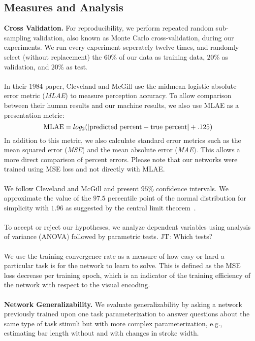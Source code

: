 \subsection{Measures and Analysis}

\noindent\textbf{Cross Validation.} For reproducibility, we perform repeated random sub-sampling validation, also known as Monte Carlo cross-validation, during our experiments. We run every experiment seperately twelve times, and randomly select (without replacement) the $60\%$ of our data as training data, $20\%$ as validation, and $20\%$ as test. 
\\~\\
 In their 1984 paper, Cleveland and McGill use the midmean logistic absolute error metric (\emph{MLAE}) to measure perception accuracy. To allow comparison between their human results and our machine results, we also use MLAE as a presentation metric:
\begin{equation}
	\textnormal{MLAE} = log_2( | \textnormal{predicted percent} - \textnormal{true percent} | + .125)
\end{equation}
In addition to this metric, we also calculate standard error metrics such as the mean squared error (\emph{MSE}) and the mean absolute error (\emph{MAE}). This allows a more direct comparison of percent errors. Please note that our networks were trained using MSE loss and not directly with MLAE.
\\~\\
 We follow Cleveland and McGill and present $95\%$ confidence intervals. We approximate the value of the $97.5$ percentile point of the normal distribution for simplicity with $1.96$ as suggested by the central limit theorem~\cite{central_limit}.
\\~\\
 To accept or reject our hypotheses, we analyze dependent variables using analysis of variance (ANOVA) followed by parametric tests. JT: Which tests?
\\~\\
 We use the training convergence rate as a measure of how easy or hard a particular task is for the network to learn to solve. This is defined as the MSE loss decrease per training epoch, which is an indicator of the training efficiency of the network with respect to the visual encoding.
\\~\\
\noindent\textbf{Network Generalizability.} We evaluate generalizability by asking a network previously trained upon one task parameterization to answer questions about the same type of task stimuli but with more complex parameterization, e.g., estimating bar length without and with changes in stroke width.

